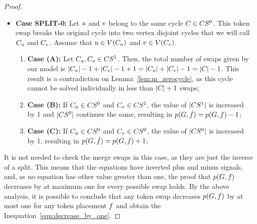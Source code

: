 \documentclass[msc]{ppgccufmg}    %
\begin{document}
\begin{proof}
\begin{itemize}
    \item \textbf{Case SPLIT-0:} Let $u$ and $v$ belong to 
    the same cycle $C \in CS^{0}$. 
    This token swap breaks the original cycle into two vertex disjoint cycles that
    we will call $C_{u}$ and $C_{v}$.
    Assume that $u \in V(C_{u})$ and 
    $v \in V(C_{v})$.
    
    \begin{enumerate}
        \item[] \textbf{Case (A):} Let $C_{u},C_{v} \in CS^{1}$.
        Then, the total number of swaps given by our model is $|C_{u}| - 1 + 
        |C_{v}| - 1 + 1 = |C_{u}| + 
        |C_{v}| - 1 = |C| - 1$.
        This result is a contradiction on Lemma~\ref{lem:m_zerocycle}, as this cycle
        cannot be solved individually in less than $|C| + 1$ swaps;
        \item[] \textbf{Case (B):} If $C_{u} \in CS^{0}$ and 
        $C_{v} \in CS^{1}$, the value of $|CS^{1}|$ 
        is increased by 1 and $|CS^{0}|$ continues the same, 
        resulting in $p(G, \dot{f}) = p(G, f) - 1$;
        \item[] \textbf{Case (C):} If $C_{u} \in CS^{0}$ and 
        $C_{v} \in CS^{0}$, the value of $|CS^{0}|$ 
        is increased by 1, resulting in $p(G, \dot{f}) 
        = p(G, f) + 1$;
    \end{enumerate}
    
    \end{itemize}
    
    It is not needed to check the merge swaps in this case, as they are just the inverse
    of a split.
    This means that the equations have inverted plus and minus signals, and, as no equation
    has other value greater than one, the proof that $p(G, f)$
    decreases by at maximum one for every possible swap holds.
    By the above analysis, it is possible to conclude that any token swap decreases
    $p(G, f)$ by at most one for any token placement $f$ and
    obtain the Inequation~\ref{equ:decrease_by_one}.
    

\end{proof}
\end{document}

